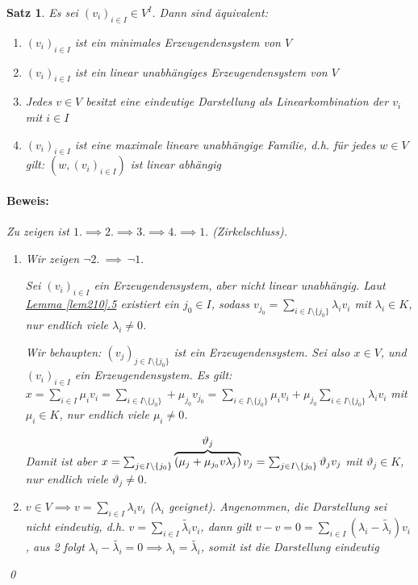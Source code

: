 \documentclass{report}
\newcommand{\lb}{\lambda}
\theoremstyle{customrem}
\theoremstyle{customdef}
\newtheorem{satz}[definition]{Satz}
\renewenvironment{proof}{\paragraph{Beweis: }}{\qed}
\theoremstyle{customenv}
\begin{document}
	
	\begin{satz}
		Es sei \((v_i)_{i\in I} \in V^I\). Dann sind äquivalent:
		\begin{enumerate}
			\item \((v_i)_{i \in I}\) ist ein minimales Erzeugendensystem von \(V\)
			\item \((v_i)_{i \in I}\) ist ein linear unabhängiges Erzeugendensystem von \(V\)
			\item Jedes \(v \in V\) besitzt eine eindeutige Darstellung als Linearkombination der \(v_i\) mit \(i \in I\)
			\item \((v_i)_{i \in I}\) ist eine maximale lineare unabhängige Familie, d.h. für jedes \(w \in V\) gilt: \((w, (v_i)_{i \in I})\) ist linear abhängig\\
		\end{enumerate}
		
		\begin{proof}
			Zu zeigen ist \(1. \implies 2. \implies 3. \implies 4. \implies 1.\) (Zirkelschluss).
			\begin{enumerate}[leftmargin=1.9cm]
				\item[1. \(\implies\) 2. ] Wir zeigen \(\neg2.\ \implies\ \neg 1.\)
				
				Sei \((v_i)_{i\in I}\) ein Erzeugendensystem, aber nicht linear unabhängig. Laut \hyperref[lem210]{Lemma \ref*{lem210}.5} existiert ein \(j_0\in I\), sodass \(v_{j_0} = \sum_{i\in I\setminus\{j_0\}} \lb_i v_i\) mit \(\lb_i\in K\), nur endlich viele \(\lb_i\not=0\). 
				
				Wir behaupten: \((v_j)_{j\in I\setminus\{j_0\}}\) ist ein Erzeugendensystem. Sei also \(x\in V\), und \((v_i)_{i\in I}\) ein Erzeugendensystem. Es gilt: \(x=\sum_{i\in I}\mu_iv_i = \sum_{i\in I\setminus\{j_0\}} + \mu_{j_0}v_{j_0} = \sum_{i\in I\setminus\{j_0\}}\mu_i v_i + \mu_{j_0}\sum_{i\in I\setminus\{j_0\}} \lb_i v_i\) mit \(\mu_i\in K\), nur endlich viele \(\mu_i \not= 0\). 
				
				Damit ist aber \(x=\sum_{j\in I\setminus\{j_0\}}\overbrace{(\mu_j+\mu_{j_0}v\lb_j)}^{\mathlarger{\mathlarger{\vartheta_j}}}v_j = \sum_{j\in I\setminus\{j_0\}} \vartheta_j v_j\) mit \(\vartheta_j\in K\), nur endlich viele \(\vartheta_j\not=0\).
				
				\item[2. \(\implies\) 3. ] \(v \in V \implies v = \sum_{i \in I}\lb_i v_i\) (\(\lb_i\) geeignet). Angenommen, die Darstellung sei nicht eindeutig, d.h. \(v = \sum_{i \in I}\widetilde{\lb_i} v_i\), dann gilt \(v - v = 0 = \sum_{i \in I} (\lb_i - \widetilde{\lb_i}) v_i\), aus 2 folgt \(\lb_i - \widetilde{\lb_i} = 0 \implies \lb_i = \widetilde{\lb_i}\), somit ist die Darstellung eindeutig
				

\end{enumerate}
\end{proof}
\end{satz}
\end{document}
